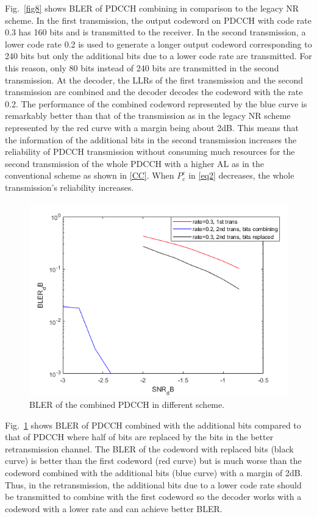 \documentclass[conference]{IEEEtran}
\begin{document}
Fig.~\ref{fig8} shows BLER of PDCCH combining in comparison to the legacy NR scheme. In the first transmission, the output codeword on PDCCH with code rate 0.3 has 160 bits and is transmitted to the receiver. In the second transmission, a lower code rate 0.2 is used to generate a longer output codeword corresponding to 240 bits but only the additional bits due to a lower code rate are transmitted. For this reason, only 80 bits instead of 240 bits are transmitted in the second transmission. At the decoder, the LLRs of the first transmission and the second transmission are combined and the decoder decodes the codeword with the rate 0.2. The performance of the combined codeword represented by the blue curve is remarkably better than that of the transmission as in the legacy NR scheme represented by the red curve with a margin being about 2dB. This means that the information of the additional bits in the second transmission increases the reliability of PDCCH transmission without consuming much resources for the second transmission of the whole PDCCH with a higher AL as in the conventional scheme as shown in \ref{CC}. When $P^{e}_{c}$ in \eqref{eq2} decreases, the whole transmission's reliability increases.  

\begin{figure}[htbp]
\centerline{\includegraphics[scale=0.43]{fig9.png}}
\caption{BLER of the combined PDCCH in different scheme.}
\label{fig9}
\end{figure}

Fig.~\ref{fig9} shows BLER of PDCCH combined with the additional bits compared to that of PDCCH where half of bits are replaced by the bits in the better retransmission channel. The BLER of the codeword with replaced bits (black curve) is better than the first codeword (red curve) but is much worse than the codeword combined  with the additional bits (blue curve) with a margin of 2dB. Thus, in the retransmission, the additional bits due to a lower code rate should be transmitted to combine with the first codeword so the decoder works with a codeword with a lower rate and can achieve better BLER.
\end{document}
